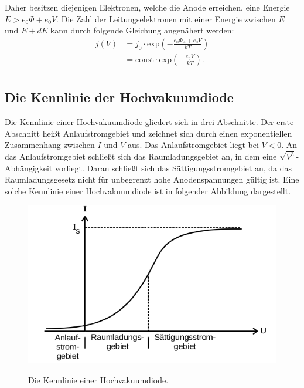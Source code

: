 \noindent
Daher besitzen diejenigen Elektronen, welche die Anode erreichen, eine Energie
$E > e_0 \Phi + e_0 V$. Die Zahl der Leitungselektronen mit einer Energie zwischen
$E$ und $E + dE$ kann durch folgende Gleichung angenähert werden:
\begin{align}
  j(V) & = j_0 \cdot \text{exp}\left(-\frac{e_0 \Phi_A + e_0 V}{kT}\right) \\
       & = \text{const} \cdot  \text{exp}\left(-\frac{e_0 V}{kT}\right).     \\
  \label{eqn:anlaufstrom}
\end{align}

\subsection{Die Kennlinie der Hochvakuumdiode}
Die Kennlinie einer Hochvakuumdiode gliedert sich in drei Abschnitte. Der erste
Abschnitt heißt Anlaufstromgebiet und zeichnet sich durch einen exponentiellen
Zusammenhang zwischen $I$ und $V$ aus. Das Anlaufstromgebiet liegt bei $V < 0$.
An das Anlaufstromgebiet schließt sich das Raumladungsgebiet an, in dem eine
$\sqrt{V^3}$-Abhängigkeit vorliegt. Daran schließt sich das Sättigungsstromgebiet
an, da das Raumladungsgesetz nicht für unbegrenzt hohe Anodenspannungen gültig ist.
Eine solche Kennlinie einer Hochvakuumdiode ist in folgender Abbildung dargestellt.
\begin{figure}[H]
  \centering
  \includegraphics[scale=0.5]{content/kennlinie.png}
  \label{fig:kennlinie}
  \caption{Die Kennlinie einer Hochvakuumdiode. \cite{AP01}}
\end{figure}
